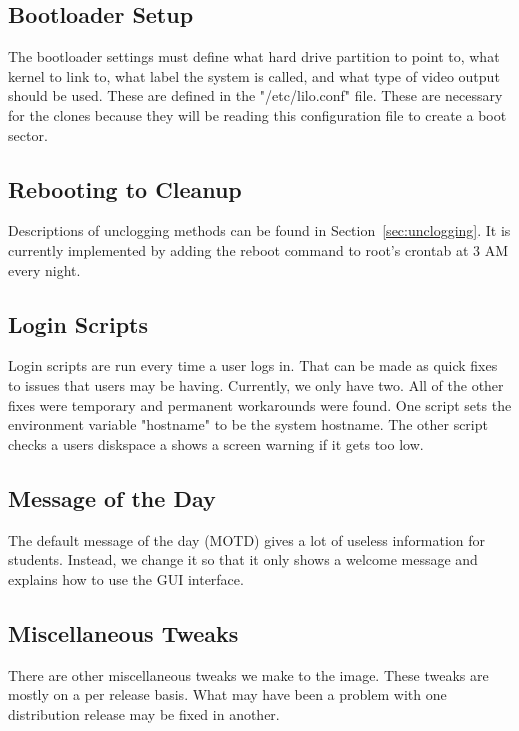 \subsection{Bootloader Setup}
The bootloader settings must define what hard drive partition to point to, what kernel to link to, what label the system is called, and what type of video output should be used.  These are defined in the "/etc/lilo.conf" file.  These are necessary for the clones because they will be reading this configuration file to create a boot sector.

\subsection{Rebooting to Cleanup}
Descriptions of unclogging methods can be found in Section~\ref{sec:unclogging}.  It is currently implemented by adding the reboot command to root's crontab at 3 AM every night.  

\subsection{Login Scripts}
Login scripts are run every time a user logs in.  That can be made as quick fixes to issues that users may be having.  Currently, we only have two.  All of the other fixes were temporary and permanent workarounds were found.  One script sets the environment variable "hostname" to be the system hostname.  The other script checks a users diskspace a shows a screen warning if it gets too low.  

\subsection{Message of the Day}
The default message of the day (MOTD) gives a lot of useless information for students.  Instead, we change it so that it only shows a welcome message and explains how to use the GUI interface.  

\subsection{Miscellaneous Tweaks}
There are other miscellaneous tweaks we make to the image.  These tweaks are mostly on a per release basis.  What may have been a problem with one distribution release may be fixed in another.  

